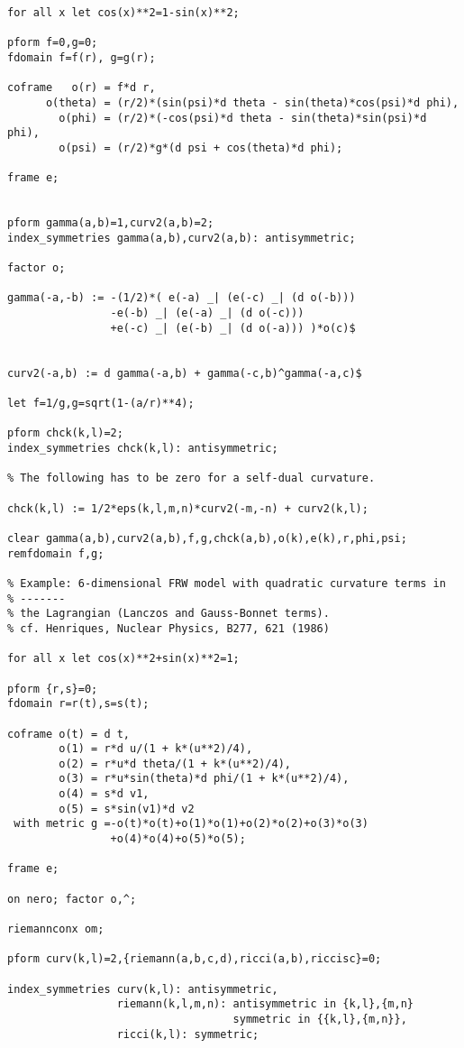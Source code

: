 {\begin{verbatim}
for all x let cos(x)**2=1-sin(x)**2;

pform f=0,g=0;
fdomain f=f(r), g=g(r);

coframe   o(r) = f*d r,
      o(theta) = (r/2)*(sin(psi)*d theta - sin(theta)*cos(psi)*d phi),
        o(phi) = (r/2)*(-cos(psi)*d theta - sin(theta)*sin(psi)*d phi),
        o(psi) = (r/2)*g*(d psi + cos(theta)*d phi);

frame e;


pform gamma(a,b)=1,curv2(a,b)=2;
index_symmetries gamma(a,b),curv2(a,b): antisymmetric;

factor o;

gamma(-a,-b) := -(1/2)*( e(-a) _| (e(-c) _| (d o(-b)))
		        -e(-b) _| (e(-a) _| (d o(-c)))
		        +e(-c) _| (e(-b) _| (d o(-a))) )*o(c)$


curv2(-a,b) := d gamma(-a,b) + gamma(-c,b)^gamma(-a,c)$

let f=1/g,g=sqrt(1-(a/r)**4);

pform chck(k,l)=2;
index_symmetries chck(k,l): antisymmetric;

% The following has to be zero for a self-dual curvature.

chck(k,l) := 1/2*eps(k,l,m,n)*curv2(-m,-n) + curv2(k,l);

clear gamma(a,b),curv2(a,b),f,g,chck(a,b),o(k),e(k),r,phi,psi;
remfdomain f,g;

% Example: 6-dimensional FRW model with quadratic curvature terms in
% -------
% the Lagrangian (Lanczos and Gauss-Bonnet terms).
% cf. Henriques, Nuclear Physics, B277, 621 (1986)

for all x let cos(x)**2+sin(x)**2=1;

pform {r,s}=0;
fdomain r=r(t),s=s(t);

coframe o(t) = d t,
        o(1) = r*d u/(1 + k*(u**2)/4),
        o(2) = r*u*d theta/(1 + k*(u**2)/4),
        o(3) = r*u*sin(theta)*d phi/(1 + k*(u**2)/4),
        o(4) = s*d v1,
        o(5) = s*sin(v1)*d v2
 with metric g =-o(t)*o(t)+o(1)*o(1)+o(2)*o(2)+o(3)*o(3)
                +o(4)*o(4)+o(5)*o(5);

frame e;

on nero; factor o,^;

riemannconx om;

pform curv(k,l)=2,{riemann(a,b,c,d),ricci(a,b),riccisc}=0;

index_symmetries curv(k,l): antisymmetric,
                 riemann(k,l,m,n): antisymmetric in {k,l},{m,n}
                                   symmetric in {{k,l},{m,n}},
                 ricci(k,l): symmetric;


\end{verbatim}}

